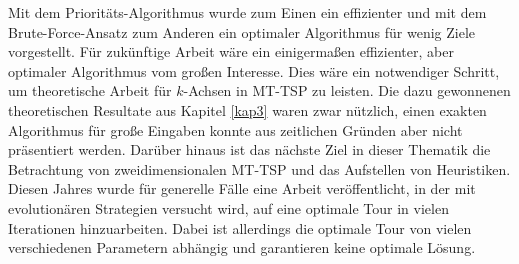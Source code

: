 \documentclass[german,version-2019-11]{uzl-thesis}
\begin{document}
Mit dem Prioritäts-Algorithmus wurde zum Einen ein effizienter und mit dem Brute-Force-Ansatz zum Anderen ein optimaler Algorithmus für wenig Ziele vorgestellt. Für zukünftige Arbeit wäre ein einigermaßen effizienter, aber optimaler Algorithmus vom großen Interesse. Dies wäre ein notwendiger Schritt, um theoretische Arbeit für $k$-Achsen in MT-TSP zu leisten. Die dazu gewonnenen theoretischen Resultate aus Kapitel \ref{kap3} waren zwar nützlich, einen exakten Algorithmus für große Eingaben konnte aus zeitlichen Gründen aber nicht präsentiert werden. Darüber hinaus ist das nächste Ziel in dieser Thematik die Betrachtung von zweidimensionalen MT-TSP und das Aufstellen von Heuristiken. Diesen Jahres wurde für generelle Fälle eine Arbeit \cite{moraes} veröffentlicht, in der mit evolutionären Strategien versucht wird, auf eine optimale Tour in vielen Iterationen hinzuarbeiten. Dabei ist allerdings die optimale Tour von vielen verschiedenen Parametern abhängig und garantieren keine optimale Lösung. 
\end{document}
